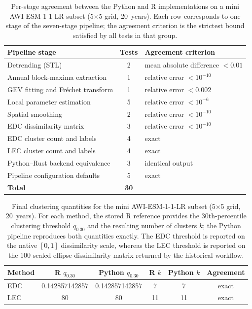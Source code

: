 \documentclass[preprint,12pt,a4paper]{elsarticle}
\begin{document}
{\begin{table}[!htbp]
\centering
\small
\setlength{\tabcolsep}{5pt}
\begin{tabularx}{\textwidth}{>{\raggedright\arraybackslash}p{4.2cm}c>{\raggedright\arraybackslash}X}
\toprule
\textbf{Pipeline stage} & \textbf{Tests} &
  \textbf{Agreement criterion} \\
\midrule
Detrending (STL) & 2 &
  mean absolute difference $< 0.01$ \\
Annual block-maxima extraction & 1 &
  relative error $< 10^{-10}$ \\
GEV fitting and Fr\'{e}chet transform & 1 &
  relative error $< 0.002$ \\
Local parameter estimation & 5 &
  relative error $< 10^{-6}$ \\
Spatial smoothing & 2 &
  relative error $< 10^{-10}$ \\
EDC dissimilarity matrix & 3 &
  relative error $< 10^{-10}$ \\
EDC cluster count and labels & 4 &
  exact \\
LEC cluster count and labels & 4 &
  exact \\
Python--Rust backend equivalence & 3 &
  identical output \\
Pipeline configuration defaults & 5 &
  exact \\
\midrule
\textbf{Total} & \textbf{30} & \\
\bottomrule
\end{tabularx}
\caption{Per-stage agreement between the Python and R
  implementations on a mini AWI-ESM-1-1-LR subset
  (5$\times$5 grid, 20~years). Each row corresponds to one
  stage of the seven-stage pipeline; the agreement criterion
  is the strictest bound satisfied by all tests in that group.}
\label{tab:pipeline-parity}
\end{table}

\begin{table}[!htbp]
\centering
\small
\setlength{\tabcolsep}{4pt}
\begin{tabular*}{\textwidth}{@{\extracolsep{\fill}}lccccc@{}}
\toprule
\textbf{Method} & \textbf{R $q_{0.30}$} & \textbf{Python $q_{0.30}$} &
  \textbf{R $k$} & \textbf{Python $k$} & \textbf{Agreement} \\
\midrule
EDC & 0.142857142857 & 0.142857142857 & 7 & 7 & exact \\
LEC & 80 & 80 & 11 & 11 & exact \\
\bottomrule
\end{tabular*}
\caption{Final clustering quantities for the mini AWI-ESM-1-1-LR
  subset (5$\times$5 grid, 20~years). For each method, the stored R
  reference provides the 30th-percentile clustering threshold
  $q_{0.30}$ and the resulting number of clusters $k$; the Python
  pipeline reproduces both quantities exactly. The EDC threshold is
  reported on the native $[0,1]$ dissimilarity scale, whereas the LEC
  threshold is reported on the 100-scaled ellipse-dissimilarity matrix
  returned by the historical workflow.}
\label{tab:mini-results}
\end{table}

}
\end{document}
